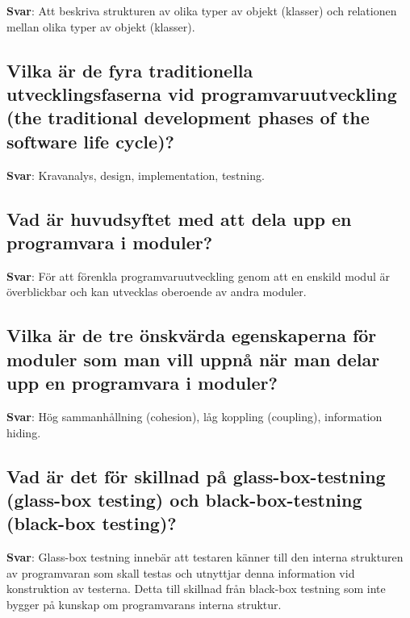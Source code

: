\documentclass[a4paper,11pt,oneside]{article}
\begin{document}
\begin{sloppypar}
\label{q:225:sa:sv:True}

\textbf{Svar}: Att beskriva strukturen av olika typer av objekt (klasser) och relationen mellan olika typer av objekt (klasser).



\subsection{Vilka \"ar de fyra traditionella utvecklingsfaserna vid programvaruutveckling (the traditional development phases of the software life cycle)?}

\label{q:226:sa:sv:True}

\textbf{Svar}: Kravanalys, design, implementation, testning.



\subsection{Vad \"ar huvudsyftet med att dela upp en programvara i moduler?}

\label{q:227:sa:sv:True}

\textbf{Svar}: F\"or att f\"orenkla programvaruutveckling genom att en enskild modul \"ar \"overblickbar och kan utvecklas oberoende av andra moduler.



\subsection{Vilka \"ar de tre \"onskv\"arda egenskaperna f\"or moduler som man vill uppn\r{a} n\"ar man delar upp en programvara i moduler?}

\label{q:228:sa:sv:True}

\textbf{Svar}: H\"og sammanh\r{a}llning (cohesion), l\r{a}g koppling (coupling), information hiding.



\subsection{Vad \"ar det f\"or skillnad p\r{a} glass-box-testning (glass-box testing) och black-box-testning (black-box testing)?}

\label{q:229:sa:sv:True}

\textbf{Svar}: Glass-box testning inneb\"ar att testaren k\"anner till den interna strukturen av programvaran som skall testas och utnyttjar denna information vid konstruktion av testerna. Detta till skillnad fr\r{a}n black-box testning som inte bygger p\r{a} kunskap om programvarans interna struktur.




\end{sloppypar}
\end{document}
